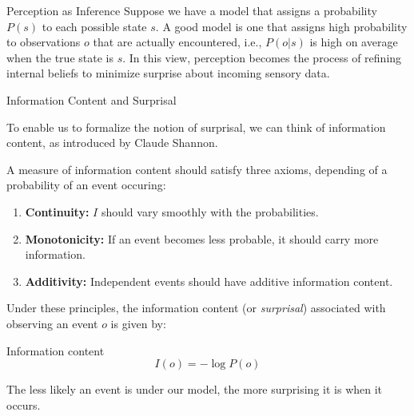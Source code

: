 \documentclass[aspectratio=1610, english]{beamer}
\begin{document}
\begin{frame}{Perception as Inference}
Suppose we have a model that assigns a probability $P(s)$ to each possible state $s$.
A good model is one that assigns high probability to observations $o$ that are actually encountered, i.e., $P(o|s)$ is high on average when the true state is $s$.
In this view, perception becomes the process of refining internal beliefs to minimize surprise about incoming sensory data.
\end{frame}

\begin{frame}{Information Content and Surprisal}

To enable us to formalize the notion of surprisal, we can think of information content, as introduced by Claude Shannon.

A measure of information content should satisfy three axioms, depending of a probability of an event occuring:
\begin{enumerate}
    \item \textbf{Continuity:} $I$ should vary smoothly with the probabilities.
    \item \textbf{Monotonicity:} If an event becomes less probable, it should carry more information.
    \item \textbf{Additivity:} Independent events should have additive information content.
\end{enumerate}

Under these principles, the information content (or \emph{surprisal}) associated with observing an event $o$ is given by:

\begin{block}{Information content}
    \begin{equation}
        I(o) = -\log P(o)
    \end{equation}
\end{block}

The less likely an event is under our model, the more surprising it is when it occurs.

\end{frame}
\end{document}
